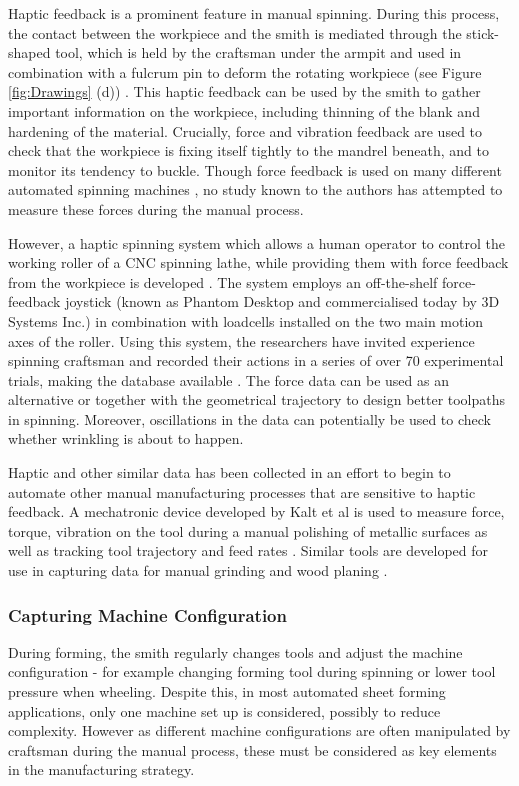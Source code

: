 Haptic feedback is a prominent feature in manual spinning. During this process, the contact between the workpiece and the smith is mediated through the stick-shaped tool, which is held by the craftsman under the armpit and used in combination with a fulcrum pin to deform the rotating workpiece (see Figure \ref{fig:Drawings} (d)) . This haptic feedback can be used by the smith to gather important information on the workpiece, including thinning of the blank and hardening of the material. Crucially, force and vibration feedback are used to check that the workpiece is fixing itself tightly to the mandrel beneath, and to monitor its tendency to buckle. Though force feedback is used on many different automated spinning machines \citep{Arai2006Force-controlledMotors}, no study known to the authors has attempted to measure these forces during the manual process. 

However, a haptic spinning system which allows a human operator to control the working roller of a CNC spinning lathe, while providing them with force feedback from the workpiece is developed \citep{Russo2019HapticSpinning}. The system employs an off-the-shelf force-feedback joystick (known as Phantom Desktop and commercialised today by 3D Systems Inc.) in combination with loadcells installed on the two main motion axes of the roller. Using this system, the researchers have invited experience spinning craftsman and recorded their actions in a series of over 70 experimental trials, making the database available \citep{Russo2020ResearchSpinning}. The force data can be used as an alternative or together with the geometrical trajectory to design better toolpaths in spinning. Moreover, oscillations in the data can potentially be used to check whether wrinkling is about to happen. 

Haptic and other similar data has been collected in an effort to begin to automate other manual manufacturing processes that are sensitive to haptic feedback. A mechatronic device developed by Kalt et al is used to measure force, torque, vibration on the tool during a manual polishing of metallic surfaces as well as tracking tool trajectory and feed rates \citep{Kalt2016TowardsOperation}. Similar tools are developed for use in capturing data for manual grinding \citep{Phan2018InstrumentationWorkpiece} and wood planing \citep{Montebelli2015OnTasks}.


\subsubsection{Capturing Machine Configuration}
During forming, the smith regularly changes tools and adjust the machine configuration - for example changing forming tool during spinning or lower tool pressure when wheeling. Despite this, in most automated sheet forming applications, only one machine set up is considered, possibly to reduce complexity. However as different machine configurations are often manipulated by craftsman during the manual process, these must be considered as key elements in the manufacturing strategy.

